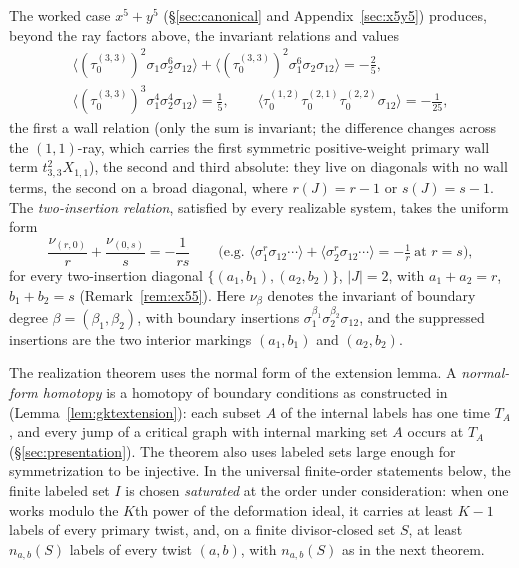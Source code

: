 \documentclass[11pt]{amsart}
\theoremstyle{definition}
\theoremstyle{remark}
\begin{document}
The worked case $x^{5}+y^{5}$ (\S\ref{sec:canonical} and Appendix~\ref{sec:x5y5})
produces, beyond the ray factors above, the invariant relations and values
\begin{gather}
\langle(\tau_{0}^{(3,3)})^{2}\sigma_{1}\sigma_{2}^{6}\sigma_{12}\rangle
+\langle(\tau_{0}^{(3,3)})^{2}\sigma_{1}^{6}\sigma_{2}\sigma_{12}\rangle
=-\tfrac25,
\label{eq:firstwallrel}\\
\langle(\tau_{0}^{(3,3)})^{3}
\sigma_{1}^{4}\sigma_{2}^{4}\sigma_{12}\rangle=\tfrac15,\qquad
\langle\tau_{0}^{(1,2)}\tau_{0}^{(2,1)}\tau_{0}^{(2,2)}\sigma_{12}\rangle
=-\tfrac1{25},
\label{eq:newinvariants}
\end{gather}
the first a wall relation (only the sum is invariant; the difference changes
across the $(1,1)$-ray, which carries the first symmetric positive-weight primary wall
term $t_{3,3}^{2}X_{1,1}$), the second and third absolute: they live on
diagonals with no wall terms, the second on a broad diagonal, where
$r(J)=r-1$ or $s(J)=s-1$.  The \emph{two-insertion relation}, satisfied by every realizable system, takes the uniform form
\begin{equation}
\label{eq:seed}
\frac{\nu_{(r,0)}}{r}+\frac{\nu_{(0,s)}}{s}=-\frac1{rs}
\qquad\text{(e.g. }\langle\sigma_{1}^{r}\sigma_{12}\cdots\rangle
+\langle\sigma_{2}^{r}\sigma_{12}\cdots\rangle=-\tfrac1r\ \text{at }r=s),
\end{equation}
for every two-insertion diagonal $\{(a_{1},b_{1}),(a_{2},b_{2})\}$,
$|J|=2$, with $a_{1}+a_{2}=r$, $b_{1}+b_{2}=s$ (Remark~\ref{rem:ex55}). Here
$\nu_{\beta}$ denotes the invariant of boundary degree $\beta=(\beta_1,\beta_2)$,
with boundary insertions $\sigma_{1}^{\beta_{1}}\sigma_{2}^{\beta_{2}}\sigma_{12}$, and
the suppressed
insertions are the two interior markings $(a_1,b_1)$ and $(a_2,b_2)$.

The realization theorem uses the normal form of the extension lemma.  A
\emph{normal-form homotopy} is a homotopy of boundary conditions as
constructed in \cite[Lem.~3.40]{GKT} (Lemma~\ref{lem:gktextension}): each subset $A$
of the internal labels has one time $T_A$, and every jump of a critical graph
with internal marking set $A$ occurs at $T_A$ (\S\ref{sec:presentation}).  The
theorem also uses labeled sets large enough for symmetrization to be
injective.  In the universal finite-order statements below, the finite
labeled set $I$ is chosen \emph{saturated} at the order under consideration:
when one works modulo the $K$th power of the deformation ideal, it carries at
least $K-1$ labels of every primary twist, and, on a finite divisor-closed
set $S$, at least $n_{a,b}(S)$ labels of every twist $(a,b)$, with
$n_{a,b}(S)$ as in the next theorem.
\end{document}
